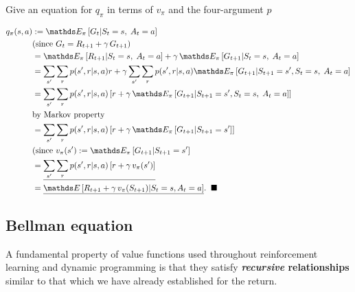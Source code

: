 \documentclass[11pt]{article}
\begin{document}
\begin{exercise} Give an equation for $q_{\pi}$ in terms of $v_{\pi}$ and the four-argument $p$
\end{exercise}
\begin{solution}
\begin{align}
q_{\pi}(s, a) &:= \E{\pi}{G_{t} | S_{t} = s, \;A_{t}=a}\nonumber\\
&(\text{since } G_{t} = R_{t+1} + \gamma\,G_{t+1}) \nonumber\\
&= \E{\pi}{R_{t+1} | S_{t} = s, \;A_{t}=a} + \gamma\,\E{\pi}{G_{t+1} | S_{t} = s, \;A_{t}=a} \nonumber\\
&= \sum_{s'}\sum_{r}p(s', r| s, a)r + \gamma\sum_{s'}\sum_{r}p(s', r| s, a) \E{\pi}{G_{t+1}| S_{t+1}=s', S_{t} = s, \;A_{t}=a}\nonumber\\
&= \sum_{s'}\sum_{r}p(s', r| s, a)\brac{r + \gamma\,\E{\pi}{G_{t+1}| S_{t+1}=s', S_{t} = s, \;A_{t}=a}}\nonumber\\
&\text{by Markov property}\nonumber\\
&= \sum_{s'}\sum_{r}p(s', r| s, a)\brac{r + \gamma\,\E{\pi}{G_{t+1} | S_{t+1}=s'}}\nonumber\\
&(\text{since }v_{\pi}(s') := \E{\pi}{G_{t+1} | S_{t+1} = s'} \nonumber\\
&= \underline{\sum_{s'}\sum_{r}p(s', r| s, a)\brac{r + \gamma\,v_{\pi}(s')}} \label{eqn: value_action_fun_by_value}\\
&=  \underline{\E{}{R_{t+1} + \gamma\,v_{\pi}(S_{t+1})| S_{t}=s, A_{t} = a}}.\;\; \QEDA \label{eqn: value_action_fun_by_value2}
\end{align}  
\end{solution}
\subsection{Bellman equation}
A fundamental property of value functions used throughout reinforcement learning and dynamic programming is that they satisfy \textbf{\emph{recursive} relationships} similar to that which we have already established for the return. 
\end{document}
